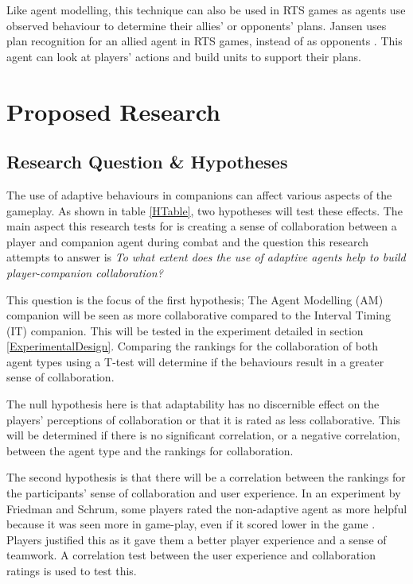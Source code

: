 \documentclass{IEEEtran}
\begin{document}
Like agent modelling, this technique can also be used in RTS games as agents use observed behaviour to determine their allies' or opponents' plans. Jansen uses plan recognition for an allied agent in RTS games, instead of as opponents \cite{PlayerAdaptiveRTSAI2007}. This agent can look at players' actions and build units to support their plans.

\section{Proposed Research}
\label{ProposedResearch}

\subsection{Research Question \& Hypotheses}
\label{Hypotheses}


The use of adaptive behaviours in companions can affect various aspects of the gameplay. As shown in table \ref{HTable}, two hypotheses will test these effects. The main aspect this research tests for is creating a sense of collaboration between a player and companion agent during combat and the question this research attempts to answer is \textit{To what extent does the use of adaptive agents help to build player-companion collaboration?}

This question is the focus of the first hypothesis; The Agent Modelling (AM) companion will be seen as more collaborative compared to the Interval Timing (IT) companion. This will be tested in the experiment detailed in section \ref{ExperimentalDesign}. Comparing the rankings for the collaboration of both agent types using a T-test will determine if the behaviours result in a greater sense of collaboration.

The null hypothesis here is that adaptability has no discernible effect on the players' perceptions of collaboration or that it is rated as less collaborative. This will be determined if there is no significant correlation, or a negative correlation, between the agent type and the rankings for collaboration.

The second hypothesis is that there will be a correlation between the rankings for the participants’ sense of collaboration and user experience. In an experiment by Friedman and Schrum, some players rated the non-adaptive agent as more helpful because it was seen more in game-play, even if it scored lower in the game \cite{CompanionBotsFPS2019}. Players justified this as it gave them a better player experience and a sense of teamwork. A correlation test between the user experience and collaboration ratings is used to test this.
\end{document}
